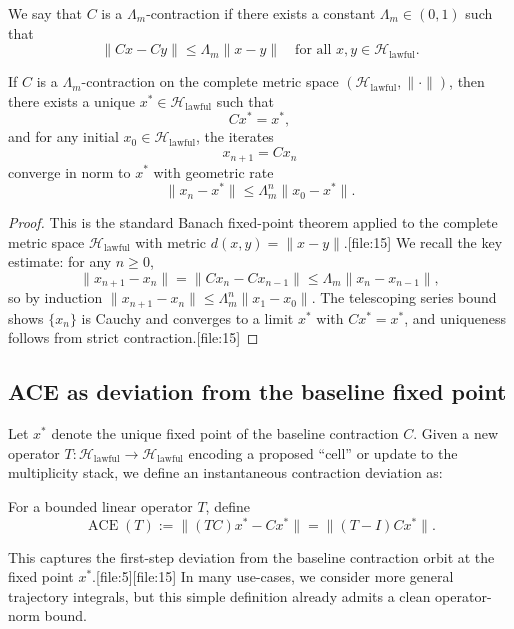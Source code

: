 \documentclass[11pt]{article}
\begin{document}
\begin{definition}
We say that \(C\) is a \(\Lambda_m\)-contraction if there exists a constant \(\Lambda_m \in (0,1)\) such that
\[
\| Cx - Cy \| \leq \Lambda_m \| x - y \| \quad \text{for all } x,y \in \mathcal{H}_{\mathrm{lawful}}.
\]
\end{definition}

\begin{lemma}
If \(C\) is a \(\Lambda_m\)-contraction on the complete metric space \((\mathcal{H}_{\mathrm{lawful}},\|\cdot\|)\), then there exists a unique \(x^\ast \in \mathcal{H}_{\mathrm{lawful}}\) such that
\[
Cx^\ast = x^\ast,
\]
and for any initial \(x_0\in\mathcal{H}_{\mathrm{lawful}}\), the iterates
\[
x_{n+1} = Cx_n
\]
converge in norm to \(x^\ast\) with geometric rate
\[
\|x_n - x^\ast\| \leq \Lambda_m^n \|x_0 - x^\ast\|.
\]
\end{lemma}

\begin{proof}
This is the standard Banach fixed-point theorem applied to the complete metric space \(\mathcal{H}_{\mathrm{lawful}}\) with metric \(d(x,y)=\|x-y\|\).[file:15]  
We recall the key estimate: for any \(n\ge 0\),
\[
\|x_{n+1}-x_n\| = \|C x_n - C x_{n-1}\| \le \Lambda_m \|x_n - x_{n-1}\|,
\]
so by induction \(\|x_{n+1}-x_n\|\le \Lambda_m^n \|x_1 - x_0\|\).  
The telescoping series bound shows \(\{x_n\}\) is Cauchy and converges to a limit \(x^\ast\) with \(Cx^\ast = x^\ast\), and uniqueness follows from strict contraction.[file:15]
\end{proof}

\subsection{ACE as deviation from the baseline fixed point}

Let \(x^\ast\) denote the unique fixed point of the baseline contraction \(C\).  
Given a new operator \(T : \mathcal{H}_{\mathrm{lawful}} \to \mathcal{H}_{\mathrm{lawful}}\) encoding a proposed ``cell'' or update to the multiplicity stack, we define an instantaneous contraction deviation as:

\begin{definition}
For a bounded linear operator \(T\), define
\[
\operatorname{ACE}(T) := \| (TC)x^\ast - Cx^\ast \| = \| (T-I)Cx^\ast \|.
\]
\end{definition}

This captures the first-step deviation from the baseline contraction orbit at the fixed point \(x^\ast\).[file:5][file:15]  
In many use-cases, we consider more general trajectory integrals, but this simple definition already admits a clean operator-norm bound.
\end{document}
